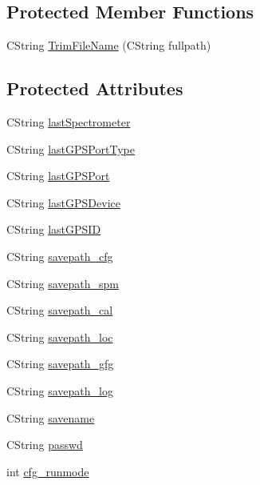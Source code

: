 \subsection*{Protected Member Functions}
\begin{DoxyCompactItemize}
\item 
CString \hyperlink{classCspec4Cfg_a6e340a52a49a4d53bcb3e7d06b1b3d32}{TrimFileName} (CString fullpath)
\end{DoxyCompactItemize}
\subsection*{Protected Attributes}
\begin{DoxyCompactItemize}
\item 
CString \hyperlink{classCspec4Cfg_a9d3e8a5b346a27b30694f68e2fc2e279}{lastSpectrometer}
\item 
CString \hyperlink{classCspec4Cfg_a54df164e159a5ea85c123295b400ea91}{lastGPSPortType}
\item 
CString \hyperlink{classCspec4Cfg_a3ecfa2d568c0fab4e34f5ca94ab0ab28}{lastGPSPort}
\item 
CString \hyperlink{classCspec4Cfg_af400c8b8847bc6188f7f6237c14c4777}{lastGPSDevice}
\item 
CString \hyperlink{classCspec4Cfg_a0afb73fbe49d55aa054cd59347325c90}{lastGPSID}
\item 
CString \hyperlink{classCspec4Cfg_a1fa965325dd03586ae31144d948032dc}{savepath\_\-cfg}
\item 
CString \hyperlink{classCspec4Cfg_a354734f68b96585c094e357aa50d95fb}{savepath\_\-spm}
\item 
CString \hyperlink{classCspec4Cfg_a8d9e34a55f4695ec53f68fa799b33281}{savepath\_\-cal}
\item 
CString \hyperlink{classCspec4Cfg_a329911703506d86a9013462bdfa65f5b}{savepath\_\-loc}
\item 
CString \hyperlink{classCspec4Cfg_a7996e4e46de333863cfbdb736d569749}{savepath\_\-gfg}
\item 
CString \hyperlink{classCspec4Cfg_ada2d4734fa6521d4a24848f4e293e50b}{savepath\_\-log}
\item 
CString \hyperlink{classCspec4Cfg_abf81e250eafd5f4db28b3ce48441919a}{savename}
\item 
CString \hyperlink{classCspec4Cfg_a35e059cd6c922e142f68862a9d951122}{passwd}
\item 
int \hyperlink{classCspec4Cfg_a6b9f1d083a116a3c70c0ddf99f511fb6}{cfg\_\-runmode}
\item 

\end{DoxyCompactItemize}
